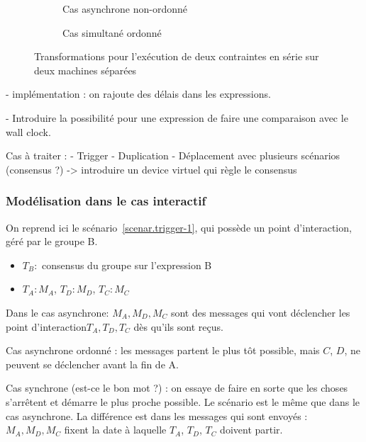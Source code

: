 \documentclass{article}
\newcommand\trigger{point d'interaction\xspace}
\begin{document}
\begin{figure}[h]
\centering
\begin{subfigure}{.5\linewidth}
\begin{tikzpicture}

\end{tikzpicture}
\caption{Cas asynchrone non-ordonné}
\end{subfigure}

\begin{subfigure}{.5\linewidth}
    \begin{tikzpicture}
    
    \end{tikzpicture}
    \caption{Cas simultané ordonné}
\end{subfigure}
\caption{Transformations pour l'exécution de deux contraintes en série sur deux machines séparées}
\label{scenar.deplacement}
\end{figure}

- implémentation : on rajoute des délais dans les expressions.

- Introduire la possibilité pour une expression de faire une comparaison avec le wall clock.


Cas à traiter : 
- Trigger
- Duplication
- Déplacement avec plusieurs scénarios (consensus ?) -> introduire un device virtuel qui règle le consensus

\subsubsection{Modélisation dans le cas interactif}
On reprend ici le scénario~\ref{scenar.trigger-1}, qui possède un \trigger, géré par le groupe B.
 
\begin{itemize}
	\item $T_B: $ consensus du groupe sur l'expression B
	\item $T_A: M_A$, $T_D: M_D$, $T_C: M_C$
\end{itemize}

Dans le cas asynchrone: $M_A, M_D, M_C$ sont des messages qui vont déclencher les \trigger $T_A, T_D, T_C$ dès qu'ils sont reçus.

Cas asynchrone ordonné : les messages partent le plus tôt possible, mais $C$, $D$, ne peuvent se déclencher avant la fin de A.

Cas synchrone (est-ce le bon mot ?) : on essaye de faire en sorte que les choses s'arrêtent et démarre le plus proche possible.
Le scénario est le même que dans le cas asynchrone. La différence est dans les messages qui sont envoyés : $M_A, M_D, M_C$ fixent la date à laquelle $T_A$, $T_D$, $T_C$ doivent partir.
\end{document}
